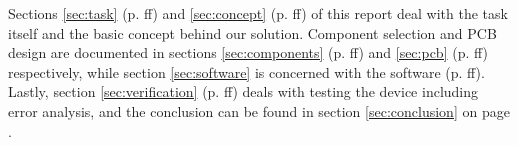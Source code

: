 Sections  \ref{sec:task}   (p.  \pageref{sec:task}ff)   and  \ref{sec:concept}
(p.   \pageref{sec:concept}ff)   of   this   report   deal   with   the   task
itself  and  the  basic   concept  behind  our  solution. Component  selection
and   PCB  design   are  documented   in  sections   \ref{sec:components}  (p.
\pageref{sec:components}ff)   and   \ref{sec:pcb}   (p.   \pageref{sec:pcb}ff)
respectively, while section \ref{sec:software}  is concerned with the software
(p.  \pageref{sec:software}ff).   Lastly, section  \ref{sec:verification}  (p.
\pageref{sec:verification}ff) deals  with testing  the device  including error
analysis, and the  conclusion can be found in  section \ref{sec:conclusion} on
page \pageref{sec:conclusion}.
